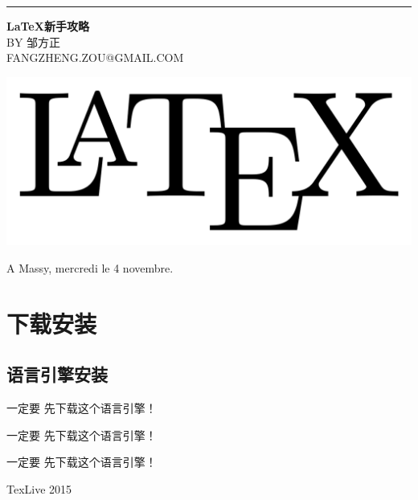 \documentclass[12pt,a4paper,oneside]{book}
\newcommand{\yihao}{\fontsize{26pt}{\baselineskip}\selectfont}%
\newcommand{\sihao}{\fontsize{14pt}{\baselineskip}\selectfont}%
\newcommand{\drop}{ 0.08\textheight}
\begin{document}
 \sihao
\begin{minipage}{0.2\textwidth}
%
\hspace*{0.2\textwidth}\textcolor[RGB]{16,136,136}{\rule{6pt}{\textheight}}
\end{minipage}
\hfill
\begin{minipage}{0.8\textwidth}

\thispagestyle{empty}
\par
\par

\vspace*{0.2\textwidth}
\hspace*{0.3\textwidth}
{\bfseries \yihao \bkmo\textcolor[RGB]{181,72,61}{\LaTeX 新手攻略}}\\[\drop]
\vspace*{0.02\textwidth}
\hspace*{0.6\textwidth}
BY {\sihao\bkmo 邹方正}\\
\vspace*{0.02\textwidth}
\hspace*{0.3\textwidth}
{\small \deja \textcolor[RGB]{20,144,188}{FANGZHENG.ZOU@GMAIL.COM}}\\
\vfill
\begin{center}
\includegraphics[scale=0.15]{Figures/latex.png}
\end{center}
\vspace*{0.1\textwidth}
\begin{center}
A Massy, mercredi le 4 novembre.
\end{center}
\end{minipage}
\restoregeometry
\setcounter{page}{1}
\tableofcontents

\newpage
\setcounter{page}{1}
\chapter{下载安装}



\section{语言引擎安装}
一定要 \textcolor[RGB]{255,0,51} {先下载}这个语言引擎！
\par
一定要 \textcolor[RGB]{255,0,51} {先下载}这个语言引擎！
\par
一定要 \textcolor[RGB]{255,0,51} {先下载}这个语言引擎！
\par
{\color{alizarin}TexLive 2015 }
\par
\end{document}
